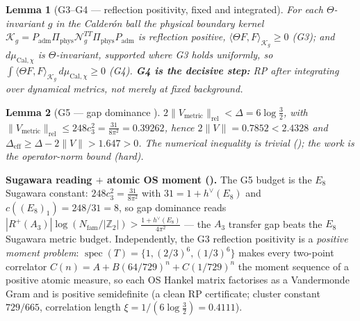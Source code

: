 \documentclass[11pt,a4paper]{article}
\newcommand{\cthree}{c_3}
\newcommand{\Nfam}{N_{\mathrm{fam}}}
\newcommand{\Z}{\mathbb Z}
\newtheorem{lemma}{Lemma}
\begin{document}
\begin{lemma}[G3--G4 --- reflection positivity, fixed and integrated]
For each $\Theta$-invariant $g$ in the Calderón ball the physical boundary kernel
$\mathcal K_g=P_{\mathrm{adm}}\Pi_{\mathrm{phys}}\mathcal N_g^{TT}\Pi_{\mathrm{phys}}P_{\mathrm{adm}}$ is
reflection positive, $\langle\Theta F,F\rangle_{\mathcal K_g}\ge0$ (G3); and $d\mu_{\mathrm{Cal},\chi}$ is
$\Theta$-invariant, supported where G3 holds uniformly, so
$\int\langle\Theta F,F\rangle_{\mathcal K_g}\,d\mu_{\mathrm{Cal},\chi}\ge0$ (G4). \textbf{G4 is the decisive
step:} RP after integrating over dynamical metrics, not merely at fixed background.
\end{lemma}

\begin{lemma}[G5 --- gap dominance \mE]
$2\|V_{\mathrm{metric}}\|_{\mathrm{rel}}<\Delta=6\log\tfrac32$, with
$\|V_{\mathrm{metric}}\|_{\mathrm{rel}}\le248\cthree^2=\tfrac{31}{8\pi^2}=0.39262$, hence
$2\|V\|=0.7852<2.4328$ and $\Delta_{\mathrm{eff}}\ge\Delta-2\|V\|>1.647>0$. The numerical inequality is
trivial (); the work is the operator-norm bound (hard).
\end{lemma}

\par\smallskip\noindent\textbf{Sugawara reading $+$ atomic OS moment ().}
The G5 budget is the $E_8$ Sugawara constant: $248\cthree^2=\tfrac{31}{8\pi^2}$ with $31=1+h^\vee(E_8)$ and
$c((E_8)_1)=248/31=8$, so gap dominance reads
$|R^+(A_3)|\log(\Nfam/|\Z_2|)>\tfrac{1+h^\vee(E_8)}{4\pi^2}$ --- the $A_3$ transfer gap beats the $E_8$
Sugawara metric budget. Independently, the G3 reflection positivity is a \emph{positive moment problem}:
$\operatorname{spec}(T)=\{1,(2/3)^6,(1/3)^6\}$ makes every two-point correlator
$C(n)=A+B(64/729)^n+C(1/729)^n$ the moment sequence of a positive atomic measure, so each OS Hankel matrix
factorises as a Vandermonde Gram and is positive semidefinite (a clean RP certificate; cluster constant
$729/665$, correlation length $\xi=1/(6\log\tfrac32)=0.4111$).
\end{document}
